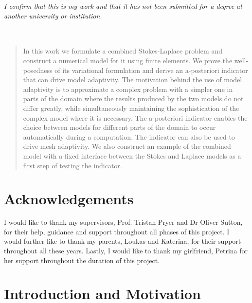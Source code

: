 \documentclass[12pt,a4paper]{article}
\theoremstyle{definition}
\begin{document}
\pagebreak
\thispagestyle{empty}
\emph{I confirm that this is my work and that it has not been submitted for a degree at another university or institution.\\}
\emph{\\}
\emph{\\}
	\vspace{1\baselineskip} 
\pagebreak
\pagebreak
\thispagestyle{empty}
\begin{abstract}
In this work we formulate a combined Stokes-Laplace problem and construct a numerical model for it using finite elements.  We prove the well-posedness of its variational formulation and derive an a-posteriori indicator that can drive model adaptivity.  The motivation behind the use of model adaptivity is to approximate a complex problem with a simpler one in parts of the domain where the results produced by the two models do not differ greatly, while simultaneously maintaining the sophistication of the complex model where it is necessary.  The a-posteriori indicator enables the choice between models for different parts of the domain to occur automatically during a computation.  The indicator can also be used to drive mesh adaptivity.  We also construct an example of the combined model with a fixed interface between the Stokes and Laplace models as a first step of testing the indicator.
\end{abstract}
\thispagestyle{empty}
\pagebreak
\pagebreak
\thispagestyle{empty}
\section*{Acknowledgements}
I would like to thank my supervisors, Prof. Tristan Pryer and Dr Oliver Sutton, for their help, guidance and support throughout all phases of this project.  I would further like to thank my parents, Loukas and Katerina, for their support throughout all these years.  Lastly, I would like to thank my girlfriend, Petrina for her support throughout the duration of this project.

\thispagestyle{empty}
\pagebreak
{}

\thispagestyle{empty}
\newpage
\tableofcontents
\thispagestyle{empty}
\newpage
\setcounter{page}{1}


\section{Introduction and Motivation}
\end{document}
